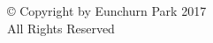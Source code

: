 \begin{titlepage}

\clearpage
{}
\vspace*{\fill}
\begin{center}
© Copyright by Eunchurn Park 2017\\
All Rights Reserved
\end{center}
\end{titlepage}